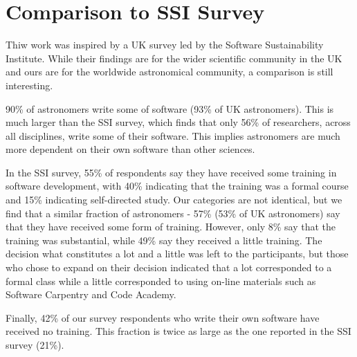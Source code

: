 \section{Comparison to SSI Survey}
\label{sec:ssicompare}

Thiw work was inspired by a UK survey led by the Software Sustainability Institute. While their findings are for the wider scientific community in the UK and ours are for the worldwide astronomical community, a comparison is still interesting. 

90\% of astronomers write some of software (93\% of UK astronomers). This is much larger than the SSI survey, which finds that only 56\% of researchers, across all disciplines, write some of their software.  This implies astronomers are much more dependent on their own software than other sciences.

In the SSI survey, 55\% of respondents say they have received some training in software development, with 40\% indicating that the training was a formal course and 15\% indicating self-directed study. Our categories are not identical, but we find that a similar fraction of astronomers - 57\% (53\% of UK astronomers) say that they have received some form of training. However, only 8\% say that the training was substantial, while 49\% say they received a little training. The decision what constitutes a lot and a little was left to the participants, but those who chose to expand on their decision indicated that a lot corresponded to a formal class while a little corresponded to using on-line materials such as Software Carpentry and Code Academy.

Finally, 42\% of our survey respondents who write their own software have received no training. This fraction is twice as large as the one reported in the SSI survey (21\%).  

